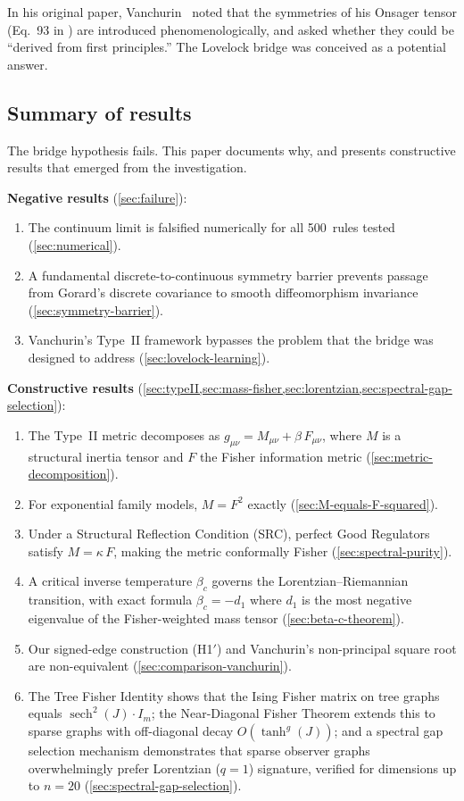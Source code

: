 \documentclass[11pt]{article}
\theoremstyle{definition}
\theoremstyle{remark}
\begin{document}
In his original paper, Vanchurin~\cite{Vanchurin2020} noted that the
symmetries of his Onsager tensor (Eq.~93 in \cite{Vanchurin2020}) are
introduced phenomenologically, and asked whether they could be
``derived from first principles.''
The Lovelock bridge was conceived as a potential answer.

\subsection{Summary of results}
\label{sec:summary}

The bridge hypothesis fails.
This paper documents why, and presents constructive results that emerged
from the investigation.

\textbf{Negative results} (\cref{sec:failure}):
\begin{enumerate}
\item The continuum limit is falsified numerically for all 500~rules
  tested (\cref{sec:numerical}).
\item A fundamental discrete-to-continuous symmetry barrier prevents
  passage from Gorard's discrete covariance to smooth diffeomorphism
  invariance (\cref{sec:symmetry-barrier}).
\item Vanchurin's Type~II framework bypasses the problem that the bridge
  was designed to address (\cref{sec:lovelock-learning}).
\end{enumerate}

\textbf{Constructive results} (\cref{sec:typeII,sec:mass-fisher,sec:lorentzian,sec:spectral-gap-selection}):
\begin{enumerate}
\item The Type~II metric decomposes as $g_{\mu\nu} = M_{\mu\nu} +
  \beta\,F_{\mu\nu}$, where $M$ is a structural inertia tensor and $F$ the
  Fisher information metric (\cref{sec:metric-decomposition}).
\item For exponential family models, $M = F^2$ exactly
  (\cref{sec:M-equals-F-squared}).
\item Under a Structural Reflection Condition (SRC), perfect Good Regulators
  satisfy $M = \kappa\,F$, making the metric conformally Fisher
  (\cref{sec:spectral-purity}).
\item A critical inverse temperature $\beta_c$ governs the
  Lorentzian--Riemannian transition, with exact formula
  $\beta_c = -d_1$ where $d_1$ is the most negative eigenvalue of the
  Fisher-weighted mass tensor (\cref{sec:beta-c-theorem}).
\item Our signed-edge construction (H1$'$) and Vanchurin's non-principal
  square root are non-equivalent (\cref{sec:comparison-vanchurin}).
\item The Tree Fisher Identity shows that the Ising Fisher matrix on
  tree graphs equals $\operatorname{sech}^2(J) \cdot I_m$; the
  Near-Diagonal Fisher Theorem extends this to sparse graphs with
  off-diagonal decay $O(\tanh^g(J))$; and a spectral gap selection
  mechanism demonstrates that sparse observer graphs overwhelmingly
  prefer Lorentzian ($q = 1$) signature, verified for dimensions up
  to $n = 20$ (\cref{sec:spectral-gap-selection}).
\end{enumerate}
\end{document}

